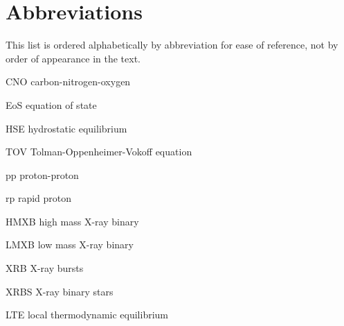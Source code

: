 \clearpage
{}
{}

\chapter*{Abbreviations}

\noindent This list is ordered alphabetically by abbreviation for ease of
reference, not by order of appearance in the text.

\begin{symbollist}{\abbrsize}


   \item [\hfil CNO] carbon-nitrogen-oxygen

   \item [\hfil EoS] equation of state

   \item [\hfil HSE] hydrostatic equilibrium

   \item [\hfil TOV] Tolman-Oppenheimer-Vokoff equation

   \item [\hfil pp] proton-proton

   \item [\hfil rp] rapid proton

   \item [\hfil HMXB] high mass X-ray binary
   
   \item [\hfil LMXB] low mass X-ray binary
   
   \item [\hfil XRB] X-ray bursts
   
   \item [\hfil XRBS] X-ray binary stars

   \item [\hfil LTE] local thermodynamic equilibrium
   
   
   
\end{symbollist}
